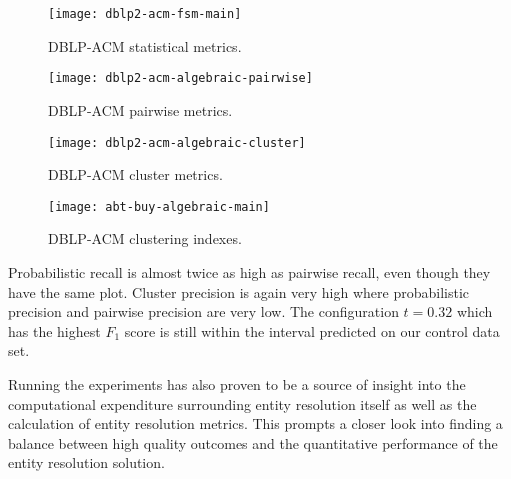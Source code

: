 \begin{figure*}[h]
    \begin{minipage}{0.24\textwidth}
        \centering
        \texttt{[image: dblp2-acm-fsm-main]}
        \caption{DBLP-ACM statistical metrics.}
        \label{fig:dblp2-acm-fsm-main}
    \end{minipage}
    \begin{minipage}{0.24\textwidth}
        \centering
        \texttt{[image: dblp2-acm-algebraic-pairwise]}
        \caption{DBLP-ACM pairwise metrics.}
        \label{fig:dblp2-acm-algebraic-pairwise}
    \end{minipage}
    \begin{minipage}{0.24\textwidth}
        \centering
        \texttt{[image: dblp2-acm-algebraic-cluster]}
        \caption{DBLP-ACM cluster metrics.}
        \label{fig:dblp2-acm-algebraic-cluster}
    \end{minipage}
    \begin{minipage}{0.24\textwidth}
        \centering
        \texttt{[image: abt-buy-algebraic-main]}
        \caption{DBLP-ACM clustering indexes.}
        \label{fig:dblp2-acm-algebraic-main}
    \end{minipage}
\end{figure*}\label{dblp2-acm}

Probabilistic recall is almost twice as high as pairwise recall, even though
they have the same plot.
Cluster precision is again very high where probabilistic precision and
pairwise precision are very low.
The configuration $t=0.32$ which has the highest $F_1$ score is still within the
interval predicted on our control data set.

Running the experiments has also proven to be a source of insight into the
computational expenditure surrounding entity resolution itself as well as the
calculation of entity resolution metrics.
This prompts a closer look into finding a balance between high quality outcomes
and the quantitative performance of the entity resolution solution.